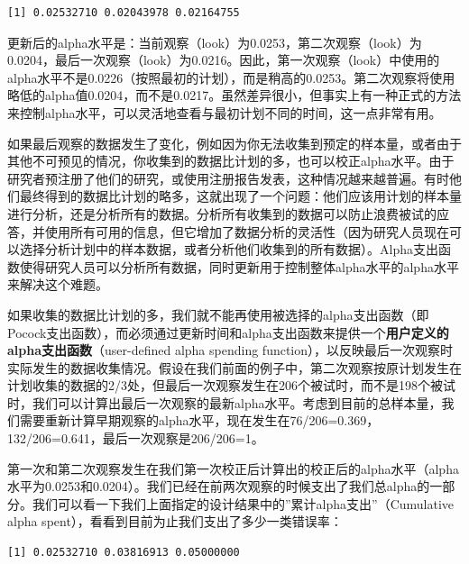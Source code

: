 \documentclass[
  letterpaper,
  DIV=11,
  numbers=noendperiod]{scrreprt}
\newenvironment{Shaded}{\begin{snugshade}}{\end{snugshade}}
\newcommand{\NormalTok}[1]{\textcolor[rgb]{0.00,0.23,0.31}{#1}}
\newcommand{\SpecialCharTok}[1]{\textcolor[rgb]{0.37,0.37,0.37}{#1}}
\begin{document}
\begin{verbatim}
[1] 0.02532710 0.02043978 0.02164755
\end{verbatim}

更新后的alpha水平是：当前观察（look）为0.0253，第二次观察（look）为0.0204，最后一次观察（look）为0.0216。因此，第一次观察（look）中使用的alpha水平不是0.0226（按照最初的计划），而是稍高的0.0253。第二次观察将使用略低的alpha值0.0204，而不是0.0217。虽然差异很小，但事实上有一种正式的方法来控制alpha水平，可以灵活地查看与最初计划不同的时间，这一点非常有用。

如果最后观察的数据发生了变化，例如因为你无法收集到预定的样本量，或者由于其他不可预见的情况，你收集到的数据比计划的多，也可以校正alpha水平。由于研究者预注册了他们的研究，或使用注册报告发表，这种情况越来越普遍。有时他们最终得到的数据比计划的略多，这就出现了一个问题：他们应该用计划的样本量进行分析，还是分析所有的数据。分析所有收集到的数据可以防止浪费被试的应答，并使用所有可用的信息，但它增加了数据分析的灵活性（因为研究人员现在可以选择分析计划中的样本数据，或者分析他们收集到的所有数据）。Alpha支出函数使得研究人员可以分析所有数据，同时更新用于控制整体alpha水平的alpha水平来解决这个难题。

如果收集的数据比计划的多，我们就不能再使用被选择的alpha支出函数（即Pocock支出函数），而必须通过更新时间和alpha支出函数来提供一个\textbf{用户定义的alpha支出函数}（user-defined
alpha spending
function），以反映最后一次观察时实际发生的数据收集情况。假设在我们前面的例子中，第二次观察按原计划发生在计划收集的数据的2/3处，但最后一次观察发生在206个被试时，而不是198个被试时，我们可以计算出最后一次观察的最新alpha水平。考虑到目前的总样本量，我们需要重新计算早期观察的alpha水平，现在发生在76/206=0.369，132/206=0.641，最后一次观察是206/206=1。

第一次和第二次观察发生在我们第一次校正后计算出的校正后的alpha水平（alpha水平为0.0253和0.0204）。我们已经在前两次观察的时候支出了我们总alpha的一部分。我们可以看一下我们上面指定的设计结果中的''累计alpha支出''（Cumulative
alpha spent），看看到目前为止我们支出了多少一类错误率：

\begin{Shaded}
\end{Shaded}

\begin{verbatim}
[1] 0.02532710 0.03816913 0.05000000
\end{verbatim}
\end{document}
